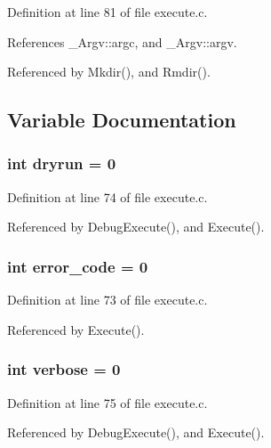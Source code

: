 Definition at line 81 of file execute.c.

References \_\-Argv::argc, and \_\-Argv::argv.

Referenced by Mkdir(), and Rmdir().

\subsection{Variable Documentation}
\subsubsection{\setlength{\rightskip}{0pt plus 5cm}int \bf{dryrun} = 0\hspace{0.3cm}{\tt  [static]}}\label{execute_8c_c13abb040ec0f2dbdef3ae8795647112}




Definition at line 74 of file execute.c.

Referenced by Debug\-Execute(), and Execute().
\subsubsection{\setlength{\rightskip}{0pt plus 5cm}int \bf{error\_\-code} = 0}\label{execute_8c_7d16b1c68c87cec009d972e79abfba78}




Definition at line 73 of file execute.c.

Referenced by Execute().
\subsubsection{\setlength{\rightskip}{0pt plus 5cm}int \bf{verbose} = 0\hspace{0.3cm}{\tt  [static]}}\label{execute_8c_0b2caeb4b6f130be43e5a2f0267dd453}




Definition at line 75 of file execute.c.

Referenced by Debug\-Execute(), and Execute().